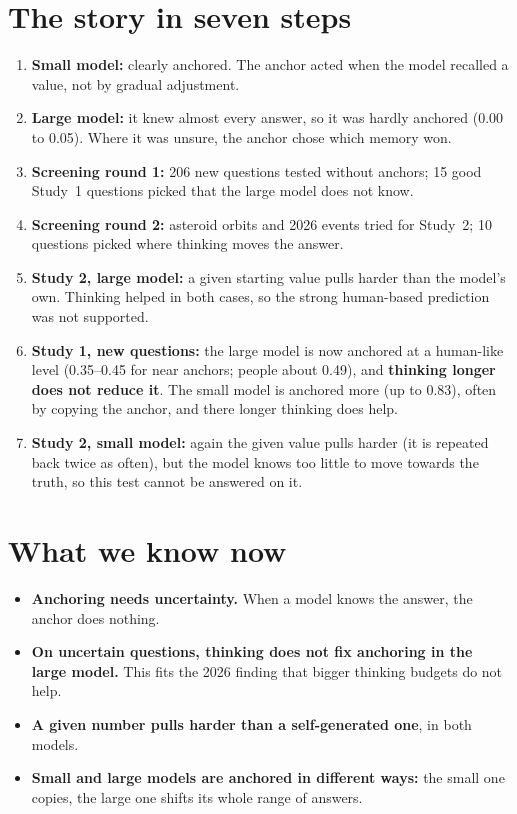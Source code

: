 \documentclass[11pt,a4paper]{article}
\begin{document}
\section*{The story in seven steps}
\begin{enumerate}[leftmargin=*]
  \item \textbf{Small model:} clearly anchored. The anchor acted when the model recalled a value, not by gradual adjustment.
  \item \textbf{Large model:} it knew almost every answer, so it was hardly anchored (0.00 to 0.05). Where it was unsure, the anchor chose which memory won.
  \item \textbf{Screening round 1:} 206 new questions tested without anchors; 15 good Study~1 questions picked that the large model does not know.
  \item \textbf{Screening round 2:} asteroid orbits and 2026 events tried for Study~2; 10 questions picked where thinking moves the answer.
  \item \textbf{Study 2, large model:} a given starting value pulls harder than the model's own. Thinking helped in both cases, so the strong human-based prediction was not supported.
  \item \textbf{Study 1, new questions:} the large model is now anchored at a human-like level (0.35--0.45 for near anchors; people about 0.49), and \textbf{thinking longer does not reduce it}. The small model is anchored more (up to 0.83), often by copying the anchor, and there longer thinking does help.
  \item \textbf{Study 2, small model:} again the given value pulls harder (it is repeated back twice as often), but the model knows too little to move towards the truth, so this test cannot be answered on it.
\end{enumerate}

\section*{What we know now}
\begin{itemize}[leftmargin=*]
  \item \textbf{Anchoring needs uncertainty.} When a model knows the answer, the anchor does nothing.
  \item \textbf{On uncertain questions, thinking does not fix anchoring in the large model.} This fits the 2026 finding that bigger thinking budgets do not help.
  \item \textbf{A given number pulls harder than a self-generated one}, in both models.
  \item \textbf{Small and large models are anchored in different ways:} the small one copies, the large one shifts its whole range of answers.
\end{itemize}
\end{document}
